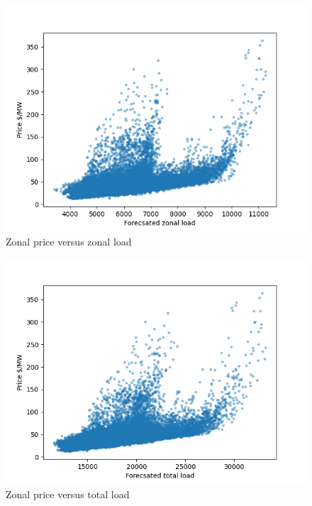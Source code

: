 \begin{figure}[!h]
    \includegraphics[width=\textwidth]{images/gefcom_zonal_price_vs_zonal_load.png}
    \caption{Zonal price versus zonal load}
    \label{fig:gefcom_zonal_price_vs_zonal_load}
\end{figure}


\begin{figure}[!h]
    \includegraphics[width=\textwidth]{images/gefcom_zonal_price_vs_total_load.png}
    \caption{Zonal price versus total load}
    \label{fig:gefcom_zonal_price_vs_total_load}
\end{figure}

